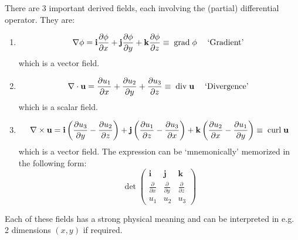 \documentclass[12pt]{report}
\theoremstyle{definition}
\begin{document}
There are 3 important derived fields, each involving the (partial) differential operator. They are:
\begin{enumerate}[label = (\arabic*)]
    \item 
        \[
            \nabla \phi = \mathbf{i}\frac{\partial\phi}{\partial x}
            + \mathbf{j}\frac{\partial\phi}{\partial y} + \mathbf{k}\frac{\partial\phi}{\partial z}
            \equiv \;\textnormal{grad}\;\phi \quad\;\textnormal{`Gradient'}\;
        \]which is a vector field.
        
    \item 
        \[
            \nabla \cdot \mathbf{u} = \frac{\partial u_1}{\partial x} 
            + \frac{\partial u_2}{\partial y} + \frac{\partial u_3}{\partial z}
            \equiv \;\textnormal{div}\;\mathbf{u} \quad\;\textnormal{`Divergence'}\;
        \]which is a scalar field.

    \item 
        \[
            \nabla \times \mathbf{u} = \mathbf{i}\left(\frac{\partial u_3}{\partial y}
            - \frac{\partial u_2}{\partial z}\right)
            + \mathbf{j}\left(\frac{\partial u_1}{\partial z} - \frac{\partial u_3}{\partial x}\right)
            + \mathbf{k}\left(\frac{\partial u_2}{\partial x} - \frac{\partial u_1}{\partial y}\right)
            \equiv \;\textnormal{curl}\;\mathbf{u}
        \]which is a vector field.
        The expression can be `mnemonically' memorized in the following form:\[
            \det{\begin{pmatrix}
                    \mathbf{i} & \mathbf{j} & \mathbf{k} \\
                    \frac{\partial}{\partial x} & \frac{\partial}{\partial y} & \frac{\partial}{\partial z} \\
                    u_1 & u_2 & u_3
            \end{pmatrix} }
        \]
\end{enumerate}

Each of these fields has a strong physical meaning and can be interpreted in
e.g. 2 dimensions $(x,y)$ if required.
\end{document}
